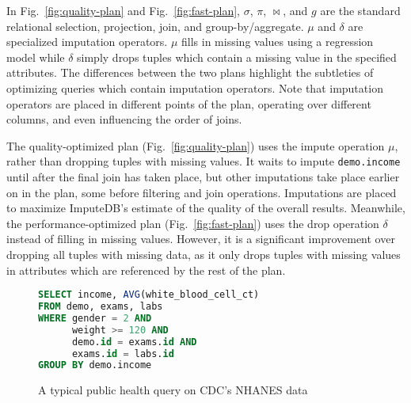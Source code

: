 In Fig.~\ref{fig:quality-plan} and Fig.~\ref{fig:fast-plan}, $\sigma$, $\pi$, $\bowtie$, and $g$ are the standard relational selection, projection, join, and group-by/aggregate.
$\mu$ and $\delta$ are specialized imputation operators.
$\mu$ fills in missing values using a regression model while $\delta$ simply drops tuples which contain a missing value in the specified attributes.
The differences between the two plans highlight the subtleties of optimizing queries which contain imputation operators.
Note that imputation operators are placed in different points of the plan, operating over different columns, and even influencing the order of joins.

The quality-optimized plan (Fig.~\ref{fig:quality-plan}) uses the impute operation $\mu$, rather than dropping tuples with missing values.
It waits to impute \verb|demo.income| until after the final join has taken place, but other imputations take place earlier on in the plan, some before filtering and join operations.
Imputations are placed to maximize ImputeDB's estimate of the quality of the overall results.
Meanwhile, the performance-optimized plan (Fig.~\ref{fig:fast-plan}) uses the drop operation $\delta$ instead of filling in missing values.
However, it is a significant improvement over dropping all tuples with missing data, as it only drops tuples with missing values in attributes which are referenced by the rest of the plan.


\begin{figure}
\begin{lstlisting}[language=SQL]
SELECT income, AVG(white_blood_cell_ct)
FROM demo, exams, labs
WHERE gender = 2 AND 
      weight >= 120 AND
      demo.id = exams.id AND 
      exams.id = labs.id
GROUP BY demo.income
\end{lstlisting}
\caption{A typical public health query on CDC's NHANES data}
\label{fig:example-query}
\end{figure}

